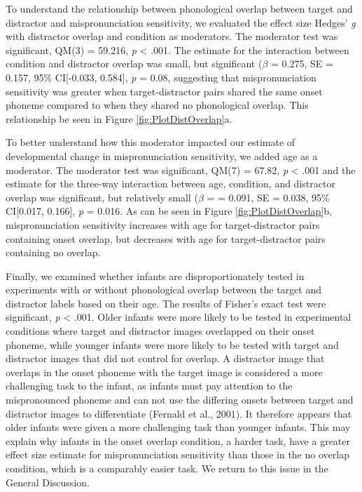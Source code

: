 \documentclass[man]{apa6}
\begin{document}
To understand the relationship between phonological overlap between target and distractor and mispronunciation sensitivity, we evaluated the effect size Hedges' \emph{g} with distractor overlap and condition as moderators. The moderator test was significant, QM(3) = 59.216, \emph{p} \textless{} .001. The estimate for the interaction between condition and distractor overlap was small, but significant (\(\beta\) = 0.275, SE = 0.157, 95\% CI{[}-0.033, 0.584{]}, \emph{p} = 0.08, suggesting that mispronunciation sensitivity was greater when target-distractor pairs shared the same onset phoneme compared to when they shared no phonological overlap. This relationship be seen in Figure \ref{fig:PlotDistOverlap}a.

To better understand how this moderator impacted our estimate of developmental change in mispronunciation sensitivity, we added age as a moderator. The moderator test was significant, QM(7) = 67.82, \emph{p} \textless{} .001 and the estimate for the three-way interaction between age, condition, and distractor overlap was significant, but relatively small (\(\beta\) = = 0.091, SE = 0.038, 95\% CI{[}0.017, 0.166{]}, \emph{p} = 0.016. As can be seen in Figure \ref{fig:PlotDistOverlap}b, mispronunciation sensitivity increases with age for target-distractor pairs containing onset overlap, but decreases with age for target-distractor pairs containing no overlap.

Finally, we examined whether infants are disproportionately tested in experiments with or without phonological overlap between the target and distractor labels based on their age. The results of Fisher's exact test were significant, \emph{p} \textless{} .001. Older infants were more likely to be tested in experimental conditions where target and distractor images overlapped on their onset phoneme, while younger infants were more likely to be tested with target and distractor images that did not control for overlap. A distractor image that overlaps in the onset phoneme with the target image is considered a more challenging task to the infant, as infants must pay attention to the mispronounced phoneme and can not use the differing onsets between target and distractor images to differentiate (Fernald et al., 2001). It therefore appears that older infants were given a more challenging task than younger infants. This may explain why infants in the onset overlap condition, a harder task, have a greater effect size estimate for mispronunciation sensitivity than those in the no overlap condition, which is a comparably easier task. We return to this issue in the General Discussion.
\end{document}
